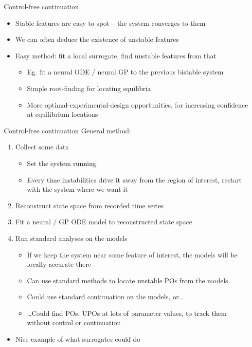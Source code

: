 \documentclass[presentation]{beamer}
\begin{document}
\begin{frame}[<+->][label={sec:org965e5ef}]{Control-free continuation}
\begin{itemize}
\item Stable features are easy to spot -- the system converges to them
\item We can often deduce the existence of unstable features
\item Easy method: fit a local surrogate, find unstable features from that
\begin{itemize}
\item Eg. fit a neural ODE / neural GP to the previous bistable system
\item Simple root-finding for locating equilibria
\item More optimal-experimental-design opportunities, for increasing confidence at equilibrium locations
\end{itemize}
\end{itemize}
\end{frame}

\begin{frame}[<+->][label={sec:orgceef2dc}]{Control-free continuation}
General method:
\begin{enumerate}
\item Collect some data
\begin{itemize}
\item Set the system running
\item Every time instabilities drive it away from the region of interest, restart with the system where we want it
\end{itemize}
\item Reconstruct state space from recorded time series
\item Fit a neural / GP ODE model to reconstructed state space
\item Run standard analyses on the models
\begin{itemize}
\item If we keep the system near some feature of interest, the models will be locally accurate there
\item Can use standard methods to locate unstable POs from the models
\item Could use standard continuation on the models, or\ldots{}
\item \ldots{}Could find POs, UPOs at lots of parameter values, to track them without control or continuation
\end{itemize}
\end{enumerate}
\begin{itemize}
\item Nice example of what surrogates could do
\end{itemize}
\end{frame}
\end{document}
